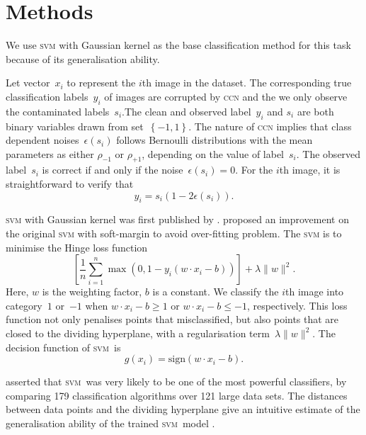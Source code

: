 \documentclass[12pt]{article} %
\newcommand{\svm}{\textsc{svm}}
\newcommand{\rhoo}{\rho_{+1}}
\newcommand{\rhoz}{\rho_{-1}}
\begin{document}
\section{Methods}\label{method}
We use \textsc{svm} with Gaussian kernel as the base classification method for this task because of its generalisation ability.

Let vector~$x_i$ to represent the $i$th image in the dataset. The corresponding true classification labels~$y_i$ of images are corrupted by \textsc{ccn} and the we only observe the contaminated labels~$s_i$.The clean and observed label~$y_i$ and $s_i$ are both binary variables drawn from set~$\left\{-1,1\right\}$.  The nature of \textsc{ccn} implies that class dependent noises~$\epsilon(s_i)$ follows Bernoulli distributions with the mean parameters as either $\rhoz$ or $\rhoo$, depending on the value of label~$s_i$. The observed label~$s_i$ is correct if and only if the noise~$\epsilon(s_i)=0$. For the $i$th image, it is straightforward to verify that
\begin{equation} \label{eq:noise}
y_i=s_i(1-2\epsilon(s_i)).
\end{equation}

\textsc{svm} with Gaussian kernel was first published by \citet{Boser:1992:TAO:130385.130401}. 
\citet{Cortes1995} proposed an improvement on the original \textsc{svm} with soft-margin  to  avoid over-fitting problem. The \textsc{svm} is to minimise the Hinge loss function
\begin{equation*}
\left[{\frac {1}{n}}\sum _{i=1}^{n}\max \left(0,1-y_{i}(w\cdot x_{i}-b)\right)\right]+\lambda \lVert w\rVert ^{2}.   
\end{equation*}
Here, $w$ is the weighting factor, $b$ is a constant. We classify the $i$th image into category~$1$ or~$-1$ when $w\cdot x_{i}-b\geq1$ or $w\cdot x_{i}-b\leq-1$, respectively. This loss function not only penalises points that misclassified, but also points that are closed to the dividing hyperplane, with a regularisation term~$\lambda \lVert w\rVert ^{2}$. The decision function of \svm\ is
\begin{equation}\label{eq:decision}
 g(x_{i})=\text{sign}(w\cdot x_{i}-b).
\end{equation}

\citet{Fernandez-Delgado:2014:WNH:2627435.2697065} asserted that \svm\ was very likely to be one of the most powerful classifiers, by comparing 179 classification algorithms over 121 large data sets. The distances between data points and the dividing hyperplane give an intuitive estimate of the generalisation ability of the trained \svm\ model \citep{hastie01statisticallearning}. 
\end{document}
